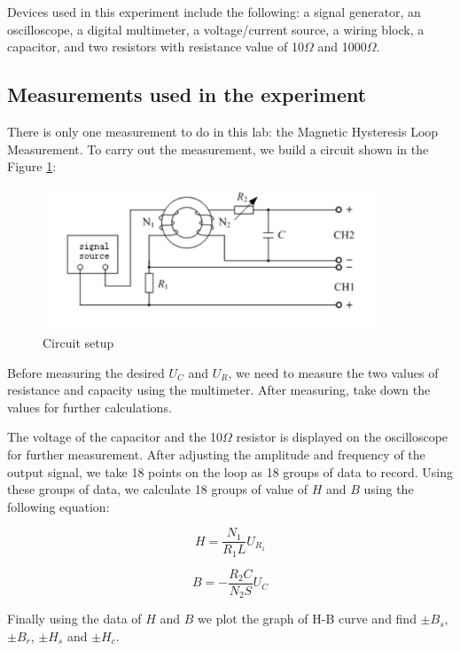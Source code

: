 \documentclass[12pt, a4paper, oneside]{article}
\begin{document}
Devices used in this experiment include the following: a signal generator, an oscilloscope, a digital multimeter, 
a voltage/current source, a wiring block, a capacitor, and two resistors with resistance value of 10$\Omega$ and 1000$\Omega$. 

\subsection{Measurements used in the experiment}
\indent

There is only one measurement to do in this lab: the Magnetic Hysteresis Loop Measurement. To carry out the measurement, we build a circuit shown in the Figure \ref{fig1}:

\begin{figure}[htbp]
	\centering
	\includegraphics[width=0.9\textwidth]{fig1.png}
	\caption{Circuit setup}
	\label{fig1}
\end{figure}

Before measuring the desired $U_C$ and $U_R$, we need to measure the two values of resistance and capacity using the multimeter. After measuring, take
down the values for further calculations.  

The voltage of the capacitor and the 10$\Omega$ resistor is displayed on the oscilloscope for further measurement. After adjusting the amplitude and frequency of the output signal, we take 18 points 
on the loop as 18 groups of data to record. Using these groups of data, we calculate 18 groups of value of $H$ and $B$ using the following equation:

\begin{equation}
	H=\frac{N_1}{R_1L}U_{R_1}
	\label{eq1}
\end{equation}

\begin{equation}
	B=-\frac{R_2C}{N_2S}U_C
	\label{eq2}
\end{equation}

Finally using the data of $H$ and $B$ we plot the graph of H-B curve and find $\pm B_s$, $\pm B_r$, $\pm H_s$ and $\pm H_c$.
\end{document}
